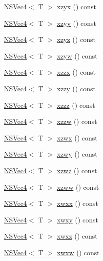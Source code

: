 \begin{DoxyCompactItemize}
\item 
\hyperlink{structNSVec4}{N\-S\-Vec4}$<$ T $>$ \hyperlink{structNSVec4_a3cc558b6d42af74508c2c6cea26234a1}{xzyx} () const 
\item 
\hyperlink{structNSVec4}{N\-S\-Vec4}$<$ T $>$ \hyperlink{structNSVec4_ab07f887324574473f4d648c8d87e10c6}{xzyy} () const 
\item 
\hyperlink{structNSVec4}{N\-S\-Vec4}$<$ T $>$ \hyperlink{structNSVec4_ab98c613d726197104d03697bc8e72539}{xzyz} () const 
\item 
\hyperlink{structNSVec4}{N\-S\-Vec4}$<$ T $>$ \hyperlink{structNSVec4_ad88e345ad38dff0377e6fa3fe5c64f56}{xzyw} () const 
\item 
\hyperlink{structNSVec4}{N\-S\-Vec4}$<$ T $>$ \hyperlink{structNSVec4_ae4812cad2e6123f92503870ebb459e90}{xzzx} () const 
\item 
\hyperlink{structNSVec4}{N\-S\-Vec4}$<$ T $>$ \hyperlink{structNSVec4_a42e78473c0ca03514a0b8e07207e0366}{xzzy} () const 
\item 
\hyperlink{structNSVec4}{N\-S\-Vec4}$<$ T $>$ \hyperlink{structNSVec4_a6ae1066f16c8e17d19133f05a307ad57}{xzzz} () const 
\item 
\hyperlink{structNSVec4}{N\-S\-Vec4}$<$ T $>$ \hyperlink{structNSVec4_a57ba36ca6778a548cd1e91306a0ff1c5}{xzzw} () const 
\item 
\hyperlink{structNSVec4}{N\-S\-Vec4}$<$ T $>$ \hyperlink{structNSVec4_a1413d9ea38d67b1f1dc0f4c83b652ba4}{xzwx} () const 
\item 
\hyperlink{structNSVec4}{N\-S\-Vec4}$<$ T $>$ \hyperlink{structNSVec4_ae1fdd6b3cd94a6141128d96ef120f9b1}{xzwy} () const 
\item 
\hyperlink{structNSVec4}{N\-S\-Vec4}$<$ T $>$ \hyperlink{structNSVec4_ad7dde1af3261c0fc0e3e609ba781c491}{xzwz} () const 
\item 
\hyperlink{structNSVec4}{N\-S\-Vec4}$<$ T $>$ \hyperlink{structNSVec4_a0ab1cc7f5c661d0cc27551efcc985d91}{xzww} () const 
\item 
\hyperlink{structNSVec4}{N\-S\-Vec4}$<$ T $>$ \hyperlink{structNSVec4_a6d7e075f7a0bf7692d87982f56c77be4}{xwxx} () const 
\item 
\hyperlink{structNSVec4}{N\-S\-Vec4}$<$ T $>$ \hyperlink{structNSVec4_a23c7e1ce13ab9ab6ac6762eb9a6f7a4c}{xwxy} () const 
\item 
\hyperlink{structNSVec4}{N\-S\-Vec4}$<$ T $>$ \hyperlink{structNSVec4_ad137ff4741910a3b64489d34793fb1c5}{xwxz} () const 
\item 
\hyperlink{structNSVec4}{N\-S\-Vec4}$<$ T $>$ \hyperlink{structNSVec4_a2ca6bcdee705f8b9c21070d96d4f9530}{xwxw} () const 

\end{DoxyCompactItemize}
